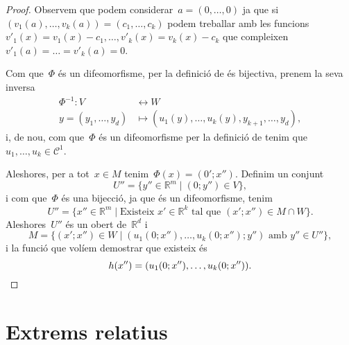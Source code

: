 \documentclass[../../main.tex]{subfiles}
\begin{document}
\begin{theorem}
\begin{proof}
            Observem que podem considerar~\(a=(0,\dots,0)\) ja que si~\((v_{1}(a),\dots,v_{k}(a))=(c_{1},\dots,c_{k})\) podem treballar amb les funcions~\(v'_{1}(x)=v_{1}(x)-c_{1},\dots,v'_{k}(x)=v_{k}(x)-c_{k}\) que compleixen~\(v'_{1}(a)=\dots=v'_{k}(a)=0\).

            Com que~\(\Phi\) és un difeomorfisme, per la definició de  és bijectiva, prenem la seva inversa
            \begin{align*}
            \Phi^{-1}\colon V&\longleftrightarrow W\\
            y=(y_{1},\dots,y_{d})&\longmapsto(u_{1}(y),\dots,u_{k}(y),y_{k+1},\dots,y_{d}),
            \end{align*}
            i, de nou, com que~\(\Phi\) és un difeomorfisme per la definició de  tenim que~\(u_{1},\dots,u_{k}\in\mathcal{C}^{1}\).

            Aleshores, per a tot~\(x\in M\) tenim~\(\Phi(x)=(0';x'')\).
            Definim un conjunt
            \[
                U''=\{y''\in\mathbb{R}^{m}\mid(0;y'')\in V\},
            \]
            i com que~\(\Phi\) és una bijecció, ja que és un difeomorfisme, tenim
            \[
                U''=\{x''\in\mathbb{R}^{m}\mid\text{Existeix }x'\in\mathbb{R}^{k}\text{ tal que }(x';x'')\in M\cap W\}.
            \]
            Aleshores~\(U''\) és un obert de~\(\mathbb{R}^{d}\) i %
            \[
                M=\{(x';x'')\in W\mid(u_{1}(0;x''),\dots,u_{k}(0;x'');y'')\text{ amb }y''\in U''\},
            \] %
            i la funció que volíem demostrar que existeix és
            \[
                h(x'')=(u_{1}(0;x''),\dots,u_{k}(0;x'')).\qedhere
            \]
        \end{proof}
    \end{theorem}
\section{Extrems relatius}
\end{document}
